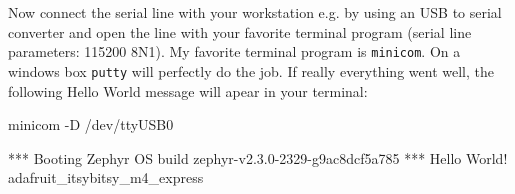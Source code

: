 Now connect the serial line with your workstation e.g. by using an USB to serial converter and open the line with your favorite terminal program (serial line parameters: 115200 8N1). My favorite terminal program is \texttt{minicom}. On a windows box \texttt{putty} will perfectly do the job. If really everything went well, the following Hello World message will apear in your terminal:
\begin{bashbox}
minicom -D /dev/ttyUSB0
\end{bashbox}


\begin{textbox}
*** Booting Zephyr OS build zephyr-v2.3.0-2329-g9ac8dcf5a785  ***                                                                                         
Hello World! adafruit_itsybitsy_m4_express
\end{textbox}
